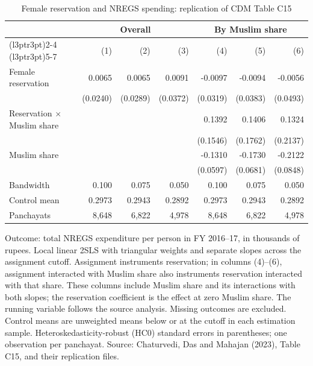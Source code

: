 \begin{table}[!h]
\centering
\caption{\label{tab:mnrega-up-cdm-fuzzy-rd}Female reservation and NREGS spending: replication of CDM Table C15}
\centering
\fontsize{9}{11}\selectfont
\begin{threeparttable}
\begin{tabular}[t]{lrrrrrr}
\toprule
\multicolumn{1}{c}{ } & \multicolumn{3}{c}{Overall} & \multicolumn{3}{c}{By Muslim share} \\
\cmidrule(l{3pt}r{3pt}){2-4} \cmidrule(l{3pt}r{3pt}){5-7}
 & (1) & (2) & (3) & (4) & (5) & (6)\\
\midrule
Female reservation & 0.0065 & 0.0065 & 0.0091 & -0.0097 & -0.0094 & -0.0056\\
 & (0.0240) & (0.0289) & (0.0372) & (0.0319) & (0.0383) & (0.0493)\\
Reservation $\times$ Muslim share &  &  &  & 0.1392 & 0.1406 & 0.1324\\
 &  &  &  & (0.1546) & (0.1762) & (0.2137)\\
Muslim share &  &  &  & -0.1310 & -0.1730 & -0.2122\\
 &  &  &  & (0.0597) & (0.0681) & (0.0848)\\
Bandwidth & 0.100 & 0.075 & 0.050 & 0.100 & 0.075 & 0.050\\
Control mean & 0.2973 & 0.2943 & 0.2892 & 0.2973 & 0.2943 & 0.2892\\
Panchayats & 8,648 & 6,822 & 4,978 & 8,648 & 6,822 & 4,978\\
\bottomrule
\end{tabular}
\begin{tablenotes}
\item Outcome: total NREGS expenditure per person in FY 2016--17, in thousands of rupees. Local linear 2SLS with triangular weights and separate slopes across the assignment cutoff. Assignment instruments reservation; in columns (4)--(6), assignment interacted with Muslim share also instruments reservation interacted with that share. These columns include Muslim share and its interactions with both slopes; the reservation coefficient is the effect at zero Muslim share. The running variable follows the source analysis. Missing outcomes are excluded. Control means are unweighted means below or at the cutoff in each estimation sample. Heteroskedasticity-robust (HC0) standard errors in parentheses; one observation per panchayat. Source: Chaturvedi, Das and Mahajan (2023), Table C15, and their replication files.
\end{tablenotes}
\end{threeparttable}
\end{table}
